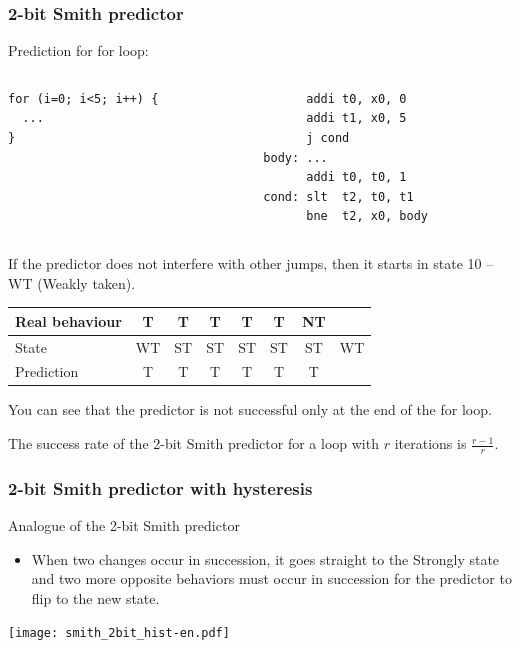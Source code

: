 \documentclass{beamer}
\begin{document}
\begin{frame}[fragile]
\frametitle{2-bit Smith predictor}

Prediction for for loop:

\begin{columns}[T]
\begin{column}{0.35\textwidth}
\begin{verbatim}
for (i=0; i<5; i++) {
  ...
}
\end{verbatim}
\end{column}
\hfill
\begin{column}{0.45\textwidth}
\begin{verbatim}
      addi t0, x0, 0
      addi t1, x0, 5
      j cond
body: ...
      addi t0, t0, 1
cond: slt  t2, t0, t1
      bne  t2, x0, body
\end{verbatim}
\end{column}
\end{columns}
\bigskip
\small
If the predictor does not interfere with other jumps, then it starts in state 10 -- WT (Weakly taken).

\begin{tabular}{|l|c|c|c|c|c|c|c|}\hline
Real behaviour & T & T & T & T & T & NT & \\ \hline
State & WT & ST & ST & ST & ST & ST & WT\\ \hline
Prediction & T & T & T & T & T & {\color{red}T} &\\\hline
\end{tabular}

You can see that the predictor is not successful only at the end of the for loop.

The success rate of the 2-bit Smith predictor for a loop with $r$ iterations is $\frac{r-1}{r}$.
\end{frame}


\begin{frame}
\frametitle{2-bit Smith predictor with hysteresis}

Analogue of the 2-bit Smith predictor
\begin{itemize}
\item When two changes occur in succession, it goes straight to the Strongly state and two more opposite behaviors must occur in succession for the predictor to flip to the new state.
\end{itemize}

\begin{center}
\texttt{[image: smith\_2bit\_hist-en.pdf]}
\end{center}
\end{frame}
\end{document}
